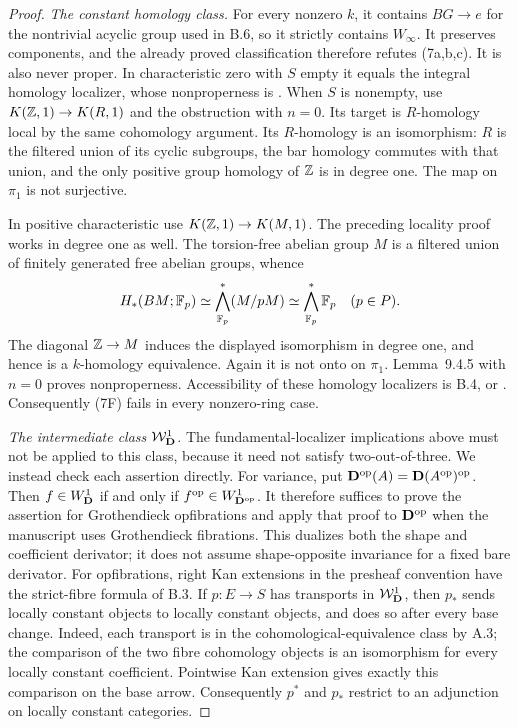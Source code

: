 \begin{proof}
\emph{The constant homology class.}
For every nonzero $k$, it contains $BG\to e$ for
the nontrivial acyclic group used in B.6, so it
strictly contains $W_\infty$. It preserves
components, and the already proved classification
therefore refutes (7a,b,c). It is also never proper.
In characteristic zero with $S$ empty it equals
the integral homology localizer, whose
nonproperness is
\citet[Scholie~9.4.7]{Cisinski2006}.
When $S$ is nonempty, use
$K(\mathbb Z,1)\to K(R,1)$ and the obstruction with
$n=0$. Its target is $R$-homology local by the
same cohomology argument. Its $R$-homology is an
isomorphism: $R$ is the filtered union of its
cyclic subgroups, the bar homology commutes with
that union, and the only positive group homology
of $\mathbb Z$ is in degree one. The map on $\pi_1$ is
not surjective.

In positive characteristic use
$K(\mathbb Z,1)\to K(M,1)$. The preceding locality proof
works in degree one as well. The torsion-free
abelian group $M$ is a filtered union of finitely
generated free abelian groups, whence
\[
 H_*(BM;\mathbb F_p)\simeq
 \bigwedge_{\mathbb F_p}^*(M/pM)
 \simeq\bigwedge_{\mathbb F_p}^*\mathbb F_p
 \quad(p\in P).
\]
The diagonal $\mathbb Z\to M$ induces the displayed
isomorphism in degree one, and hence is a
$k$-homology equivalence. Again it is not onto
on $\pi_1$. Lemma~9.4.5 with $n=0$ proves
nonproperness. Accessibility of these homology
localizers is B.4, or
\citet[Theorem~9.4.2 and Corollary~9.4.3]{Cisinski2006}.
Consequently (7F) fails in every nonzero-ring case.

\emph{The intermediate class $\mathcal W_{\mathbf D}^{1}$.}
The fundamental-localizer implications above must
not be applied to this class, because it need not
satisfy two-out-of-three. We instead check each
assertion directly. For variance, put
$\mathbf D^{\mathrm{op}}(A)=\mathbf D(A^{\mathrm{op}})^{\mathrm{op}}$. Then
$f\in W^1_{\mathbf D}$ if and only if
$f^{\mathrm{op}}\in W^1_{\mathbf D^{\mathrm{op}}}$.
It therefore suffices to prove the assertion for
Grothendieck opfibrations and apply that proof
to $\mathbf D^{\mathrm{op}}$ when the manuscript uses
Grothendieck fibrations. This dualizes both the
shape and coefficient derivator; it does not
assume shape-opposite invariance for a fixed
bare derivator. For opfibrations, right Kan
extensions in the presheaf convention have
the strict-fibre formula of B.3.
If $p:E\to S$ has transports in $\mathcal W_{\mathbf D}^{1}$, then
$p_*$ sends locally constant objects to locally
constant objects, and does so after every base
change. Indeed, each transport is in the
cohomological-equivalence class by A.3; the
comparison of the two fibre cohomology objects
is an isomorphism for every locally constant
coefficient. Pointwise Kan extension gives
exactly this comparison on the base arrow.
Consequently $p^*$ and $p_*$ restrict to an
adjunction on locally constant categories.


\end{proof}
